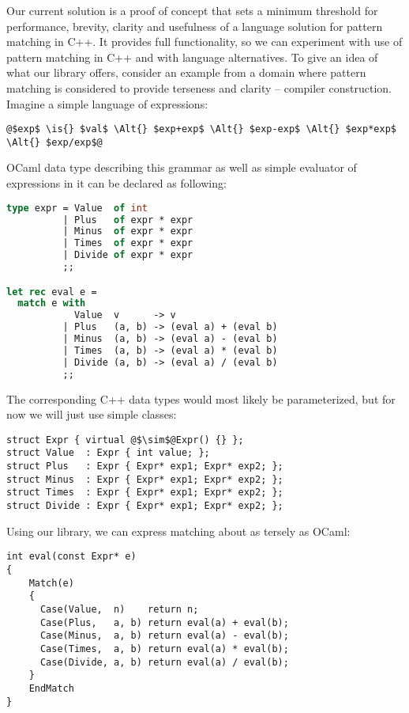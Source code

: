 \documentclass[preprint]{sigplanconf}
\newcommand{\Alt}{\ensuremath{|}}
\newcommand{\is}{$::=$}
\begin{document}
Our current solution is a proof of concept that sets a minimum threshold for 
performance, brevity, clarity and usefulness of a language solution for pattern 
matching in C++. It provides full functionality, so we can experiment with use 
of pattern matching in C++ and with language alternatives. To give an idea of 
what our library offers, consider an example from a domain where pattern matching 
is considered to provide terseness and clarity -- compiler construction. Imagine 
a simple language of expressions:

\begin{lstlisting}
@$exp$ \is{} $val$ \Alt{} $exp+exp$ \Alt{} $exp-exp$ \Alt{} $exp*exp$ \Alt{} $exp/exp$@
\end{lstlisting}

OCaml data type describing this grammar as well as simple evaluator of expressions 
in it can be declared as following:

\begin{lstlisting}[language=Caml,keepspaces,columns=flexible]
type expr = Value  of int
          | Plus   of expr * expr
          | Minus  of expr * expr
          | Times  of expr * expr
          | Divide of expr * expr
          ;;

let rec eval e =
  match e with
            Value  v      -> v
          | Plus   (a, b) -> (eval a) + (eval b)
          | Minus  (a, b) -> (eval a) - (eval b)
          | Times  (a, b) -> (eval a) * (eval b)
          | Divide (a, b) -> (eval a) / (eval b)
          ;;
\end{lstlisting}

The corresponding C++ data types would most likely be parameterized, but for
now we will just use simple classes:

\begin{lstlisting}[keepspaces,columns=flexible]
struct Expr { virtual @$\sim$@Expr() {} };
struct Value  : Expr { int value; };
struct Plus   : Expr { Expr* exp1; Expr* exp2; };
struct Minus  : Expr { Expr* exp1; Expr* exp2; };
struct Times  : Expr { Expr* exp1; Expr* exp2; };
struct Divide : Expr { Expr* exp1; Expr* exp2; };
\end{lstlisting}

Using our library, we can express matching about as tersely as OCaml:

\begin{lstlisting}[keepspaces,columns=flexible]
int eval(const Expr* e)
{
    Match(e)
    {
      Case(Value,  n)    return n;
      Case(Plus,   a, b) return eval(a) + eval(b);
      Case(Minus,  a, b) return eval(a) - eval(b);
      Case(Times,  a, b) return eval(a) * eval(b);
      Case(Divide, a, b) return eval(a) / eval(b);
    }
    EndMatch
}
\end{lstlisting}
\end{document}
